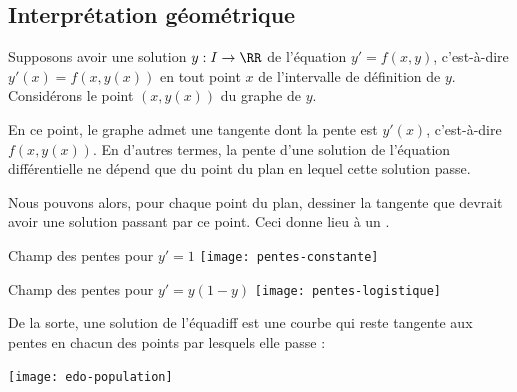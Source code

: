 \subsection{Interprétation géométrique}
\begin{frame}
  Supposons avoir une solution \(y : I \to \RR\) de l'équation \(y' = f(x,y)\),\pause{} c'est-à-dire \(y'(x)= f(x,y(x))\) en tout point \(x\) de l'intervalle de définition de \(y\).\pause{} Considérons le point \((x,y(x))\) du graphe de \(y\).\pause{}

  En ce point, le graphe admet une tangente dont la pente est \(y'(x)\), c'est-à-dire \(f(x,y(x))\).\pause{} En d'autres termes, la pente d'une solution de l'équation différentielle\pause{} ne dépend que du point du plan en lequel cette solution passe.\pause{}

  Nous pouvons alors, pour chaque point du plan, dessiner la tangente que devrait avoir une solution passant par ce point.\pause{} Ceci donne lieu à un .
\end{frame}
\begin{frame}{Champ des pentes pour $y' = 1$}
  \texttt{[image: pentes-constante]}
\end{frame}
\begin{frame}{Champ des pentes pour $y' = y (1-y)$}
  \texttt{[image: pentes-logistique]}
\end{frame}
\begin{frame}
  De la sorte, une solution de l'équadiff est une courbe\pause{} qui reste tangente aux pentes\pause{} en chacun des points par lesquels elle passe :\pause{}

    \centering
    \texttt{[image: edo-population]}

\end{frame}

